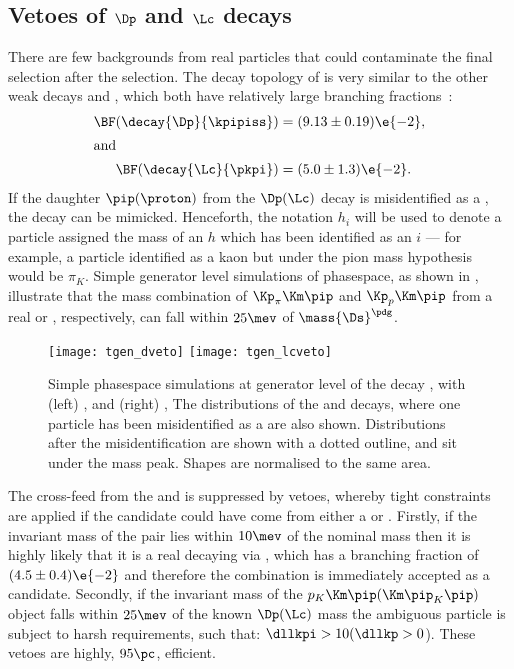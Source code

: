 \subsection[Vetoes of {\Dp} and {\Lc} deacys]
{Vetoes of $\boldsymbol{\Dp}$ and $\boldsymbol{\Lc}$ decays}
\label{sec:dsphi:sel:veto}
There are few backgrounds from real particles that could contaminate the final selection after the
\bdt selection.
The decay topology of \dstokkpi is very similar to the other weak decays \decay{\Dp}{\kpipiss} and
\decay{\Lc}{\pkpi}, which both
have relatively large branching fractions~\cite{PDG2012}:
\begin{align}
  \BF(\decay{\Dp}{\kpipiss}) &= (9.13\pm0.19)\e{-2}, \nonumber\\
  \intertext{and}
  \BF(\decay{\Lc}{\pkpi}) &= (5.0\pm1.3)\e{-2}.\nonumber
\end{align}
If the daughter $\pip(\proton)$ from the $\Dp(\Lc)$ decay is misidentified as a \Kp, the decay
\dstokkpi can be mimicked.
Henceforth, the notation $h_i$ will be used to denote a particle assigned the mass of an $h$ which
has been identified as an $i$ --- for example, a particle identified as a kaon but under the
pion mass hypothesis would be $\pi_K$.
Simple generator level simulations of phasespace, as shown in , illustrate that
the mass combination of $\Kp_\pi\Km\pip$ and $\Kp_p\Km\pip$ from a real \Dp or \Lc, respectively,
can fall within $25\mev$ of $\mass{\Ds}^\pdg$.


\begin{figure}
  \begin{center}
    \texttt{[image: tgen\_dveto]}
    \texttt{[image: tgen\_lcveto]}
    \caption[Vetoing \Ds contamination from \Lc and \Dp decays]
    {
      Simple phasespace simulations at generator level of the decay \decay{\Ds}{\kkpi}, with
      (left) \decay{\Dp}{\kpipiss}, and
      (right) \decay{\Lc}{\pkpi},
      The distributions of the \Dp and \Lc decays, where one particle has been misidentified as a
      \Kp are also shown.
      Distributions after the misidentification are shown with a dotted outline, and sit under the
      \Ds mass peak.
      Shapes are normalised to the same area.
    }
    \label{fig:dsphi:veto}
  \end{center}
\end{figure}

The cross-feed from the \Dp and \Lc is suppressed by vetoes, whereby tight \pid constraints are
applied if the \dstokkpi candidate could have come from either a \Dp or \Lc.
Firstly, if the invariant mass of the \kk pair lies within $10\mev$ of the nominal \phii mass
then it is highly likely that it is a real \Ds decaying via \decay{\Ds}{\phi\pip}, which has a
branching fraction of $(4.5\pm0.4)\e{-2}$ and therefore the \kkpi combination is immediately
accepted as a \Ds candidate.
Secondly, if the invariant mass of the $p_K\Km\pip(\Km\pip_K\pip)$ object falls within $25\mev$ of
the known $\Dp(\Lc)$ mass the ambiguous particle is subject to harsh \pid requirements, such that:
$\dllkpi>10(\dllkp>0$).
These vetoes are highly, \approx$95\pc$, efficient.



